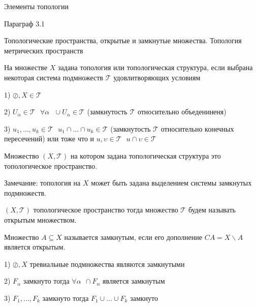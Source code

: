 \begin{title}
  Элементы топологии
\end{title}

\begin{title}[\Large]
  Параграф 3.1
\end{title}

\begin{title}[\Large]
  Топологические пространства, открытые и замкнутые множества. Топология
  метрических пространств
\end{title}

\begin{define}
  На множестве $X$ задана топология или топологическая структура, если
  выбрана некоторая система подмножеств $\mathcal{T}$ удовлитворяющих условиям

  1) $\oslash, X \in \mathcal{T}$

  2) $U_{\alpha} \in \mathcal{T} ~~~ \forall \alpha ~~~ \cup U_{\alpha} \in
  \mathcal{T}$ (замкнутость $\mathcal{T}$ относительно объедениненя)

  3) $u_1, \ldots, u_k \in \mathcal{T} ~~~ u_1 \cap \ldots \cap u_k \in
  \mathcal{T}$ (замкнутость $\mathcal{T}$ относительно конечных пересечений)
  или тоже что и $u, \upsilon \in \mathcal{T} ~~~ u \cap \upsilon \in
  \mathcal{T}$
\end{define}

\begin{define}
  Множество $(X, \mathcal{T})$ на котором задана топологическая структура это
  топологическое пространство.

  Замечание: топология на $X$ может быть задана выделением системы замкнутых
  подмножеств.
\end{define}

\begin{define}
  $(X, \mathcal{T})$ топологическое пространство тогда множество
  $\mathcal{T}$ будем называть открытым множеством.
\end{define}

\begin{define}
  Множество $A \subseteq X$ называется замкнутым, если его дополнение
  $CA = X \backslash A$ является открытым.
\end{define}

\begin{block}
  1) $\oslash, X$ тревиальные подмножества являются замкнутыми

  2) $F_{\alpha}$ замкнуто тогда $\forall \alpha ~~
  \cap F_{\alpha}$ является замкнутым

  3) $F_1, \ldots, F_k$ замкнуто тогда $F_1 \cup \ldots \cup F_k$ замкнуто
\end{block}

